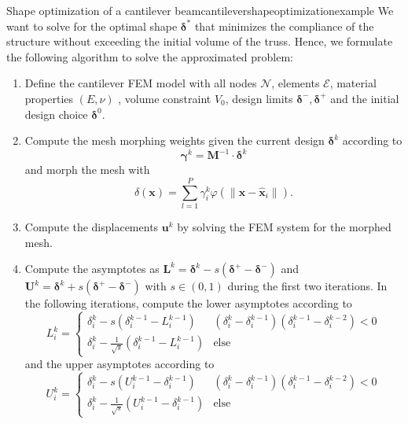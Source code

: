 \begin{example}{Shape optimization of a cantilever beam}{cantilevershapeoptimizationexample}
    We want to solve for the optimal shape $\pmb{\delta}^*$ that minimizes the compliance of the structure without exceeding the initial volume of the truss. Hence, we formulate the following algorithm to solve the approximated problem: 
    \begin{enumerate}
        \item Define the cantilever FEM model with all nodes $\mathcal{N}$, elements $\mathcal{E}$, material properties $(E, \nu)$ , volume constraint $V_0$, design limits $\pmb{\delta}^-, \pmb{\delta}^+$ and the initial design choice $\pmb{\delta}^0$.
        \item Compute the mesh morphing weights given the current design $\pmb{\delta}^k$ according to
        \begin{equation}
             \pmb{\gamma}^k = \mathbf{M}^{-1} \cdot \pmb{\delta}^k 
        \end{equation}
        and morph the mesh with 
        \begin{equation}
            \delta(\mathbf{x}) = \sum_{l=1}^P \gamma_i^k \varphi(\lVert \mathbf{x}-\hat{\mathbf{x}}_i \rVert).
        \end{equation}
        \item Compute the displacements $\mathbf{u}^k$ by solving the FEM system for the morphed mesh.
        \item Compute the asymptotes as $\mathbf{L}^k = \pmb{\delta}^k - s (\pmb{\delta}^+ - \pmb{\delta}^-)$ and $\mathbf{U}^k =\pmb{\delta}^k + s (\pmb{\delta}^+ - \pmb{\delta}^-)$ with $s \in (0,1)$ during the first two iterations. In the following iterations, compute the lower asymptotes according to 
        \begin{equation}
            L^k_i = 
            \begin{cases}
                \delta^k_i - s  (\delta^{k-1}_i-L^{k-1}_i) & (\delta_i^k-\delta_i^{k-1})(\delta_i^{k-1}-\delta_i^{k-2}) < 0\\
                \delta^k_i - \frac{1}{\sqrt{s}}  (\delta^{k-1}_i-L^{k-1}_i) & \text{else}
            \end{cases}
        \end{equation}
        and the upper asymptotes according to 
        \begin{equation}
            U^k_i = 
            \begin{cases}
                \delta^k_i - s  (U^{k-1}_i-\delta^{k-1}_i) & (\delta_i^k-\delta_i^{k-1})(\delta_i^{k-1}-\delta_i^{k-2}) < 0\\
                \delta^k_i - \frac{1}{\sqrt{s}}  (U^{k-1}_i-\delta^{k-1}_i) & \text{else}

\end{cases}
\end{equation}
\end{enumerate}
\end{example}
